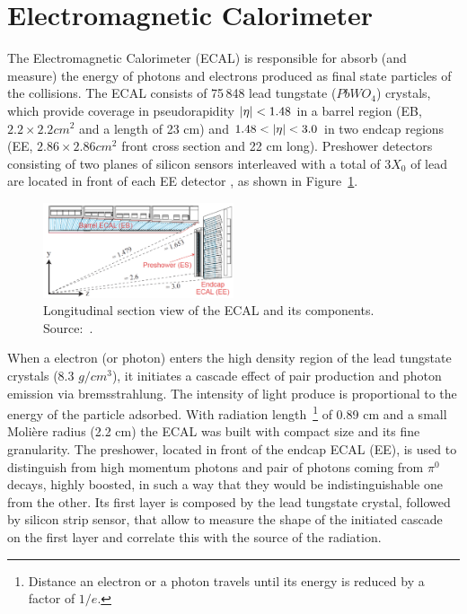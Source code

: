 
\section{Electromagnetic Calorimeter}

The Electromagnetic Calorimeter (ECAL) is responsible for absorb (and measure) the energy of photons and electrons produced as final state particles of the collisions. The ECAL consists of 75\,848 lead tungstate ($PbWO_4$) crystals, which provide coverage in pseudorapidity $\lvert \eta \rvert < 1.48 $ in a barrel region (EB, $2.2 \times 2.2 cm^2$ and a length of 23 cm) and $1.48 < \lvert \eta \rvert < 3.0$ in two endcap regions (EE, $2.86 \times 2.86 cm^2$ front cross section and 22 cm long). Preshower detectors consisting of two planes of silicon sensors interleaved with a total of $3 X_0$ of lead are located in front of each EE detector \cite{Khachatryan:2015hwa}, as shown in Figure~\ref{cms_ecal}. 

\begin{figure}[htbp]
    \centering
    \includegraphics[width=0.5\textwidth]{figures_and_tables/experimental_setup/cms_ecal.png}
    \caption{Longitudinal section view of the ECAL and its components. Source:~\cite{Chatrchyan:2008zzk}.}
    \label{cms_ecal}
\end{figure}

When a electron (or photon) enters the high density region of the lead tungstate crystals (8.3 $g/cm^3$), it initiates a cascade effect of pair production and photon emission via bremsstrahlung. The intensity of light produce is proportional to the energy of the particle adsorbed. With radiation length~\footnote{Distance an electron or a photon travels
until its energy is reduced by a factor of $1/e$.} of 0.89 cm and a small Molière radius (2.2 cm) the ECAL was built with compact size and its fine granularity. The preshower, located in front of the endcap ECAL (EE), is used to distinguish from high momentum photons and pair of photons coming from $\pi^0$ decays, highly boosted, in such a way that they would be indistinguishable one from the other. Its first layer is composed by the lead tungstate crystal, followed by silicon strip sensor, that allow to measure the shape of the initiated cascade on the first layer and correlate this with the source of the radiation. 

